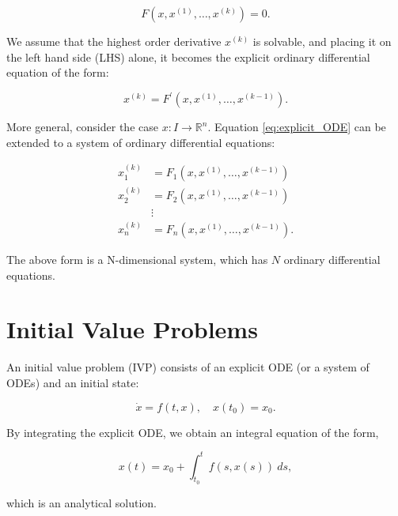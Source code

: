 \documentclass[
	parskip, 			   %
	twoside, 			   %
	DIV=14, 			   %
	BCOR=15.0mm, 		   %
	headsepline, 		   %
	open=right, 		   %
	captions=tableheading, %
	bibliography=totoc,    %
	numbers=noenddot       %
]{scrreprt}
\begin{document}
\begin{equation}
    \label{eq:implicit_ODE}
    F\left(x, x^{(1)}, \ldots, x^{(k)}\right)=0.
\end{equation}

We assume that the highest order derivative $x^{(k)}$ is solvable, and placing it on the left hand side (LHS) alone, it becomes the explicit ordinary differential equation of the form:

\begin{equation}
    \label{eq:explicit_ODE}
    x^{(k)} = F^{\prime} \left(x, x^{(1)}, \ldots, x^{(k-1)}\right).
\end{equation}

More general, consider the case $x: I \rightarrow \mathbb{R}^{n}$. Equation \ref{eq:explicit_ODE} can be extended to a system of ordinary differential equations:

\begin{equation}
    \label{eq:ODE_system}
    \begin{aligned}
    x_{1}^{(k)} &=F_{1}\left(x, x^{(1)}, \ldots, x^{(k-1)}\right) \\
    x_{2}^{(k)} &=F_{2}\left(x, x^{(1)}, \ldots, x^{(k-1)}\right) \\
    & \vdots \\
    x_{n}^{(k)} &=F_{n}\left(x, x^{(1)}, \ldots, x^{(k-1)}\right).
\end{aligned}
\end{equation}

The above form is a N-dimensional system, which has $N$ ordinary differential equations.

\section{Initial Value Problems}
An initial value problem (IVP) consists of an explicit ODE (or a system of ODEs) and an initial state:

\begin{equation}
    \label{eq:IVP}
    \dot{x} = f(t, x), \quad x(t_{0})=x_{0}.
\end{equation}

By integrating the explicit ODE, we obtain an integral equation of the form,

\begin{equation}
    \label{eq:solution_IVP}
    x(t) = x_{0} + \int_{t_{0}}^{t} f(s, x(s))\:ds,
\end{equation}

which is an analytical solution.
\end{document}
